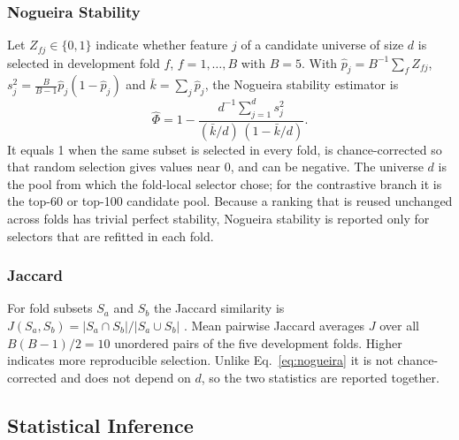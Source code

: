 \documentclass[preprint,12pt]{elsarticle}
\begin{document}
\subsubsection{Nogueira Stability}
\label{subsubsec:nogueira}
Let $Z_{fj}\in\{0,1\}$ indicate whether feature $j$ of a candidate universe of size $d$ is selected in development fold $f$, $f=1,\dots,B$ with $B=5$. With $\hat p_j=B^{-1}\sum_f Z_{fj}$, $s_j^2=\frac{B}{B-1}\hat p_j(1-\hat p_j)$ and $\bar k=\sum_j \hat p_j$, the Nogueira stability estimator is \cite{nogueira2018}
\begin{equation}
    \hat\Phi=1-\frac{d^{-1}\sum_{j=1}^{d}s_j^2}{(\bar k/d)\,(1-\bar k/d)} .
    \label{eq:nogueira}
\end{equation}
It equals 1 when the same subset is selected in every fold, is chance-corrected so that random selection gives values near 0, and can be negative. The universe $d$ is the pool from which the fold-local selector chose; for the contrastive branch it is the top-60 or top-100 candidate pool. Because a ranking that is reused unchanged across folds has trivial perfect stability, Nogueira stability is reported only for selectors that are refitted in each fold.

\subsubsection{Jaccard}
\label{subsubsec:jaccard}
For fold subsets $S_a$ and $S_b$ the Jaccard similarity is $J(S_a,S_b)=|S_a\cap S_b|/|S_a\cup S_b|$ \cite{jaccard1901}. Mean pairwise Jaccard averages $J$ over all $B(B-1)/2=10$ unordered pairs of the five development folds. Higher indicates more reproducible selection. Unlike Eq.~\eqref{eq:nogueira} it is not chance-corrected and does not depend on $d$, so the two statistics are reported together.

\subsection{Statistical Inference}
\label{subsec:inference}
\end{document}
